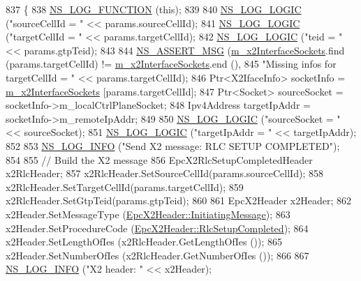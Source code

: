 \begin{DoxyCode}
837 \{
838   \hyperlink{log-macros-disabled_8h_a90b90d5bad1f39cb1b64923ea94c0761}{NS\_LOG\_FUNCTION} (\textcolor{keyword}{this});
839 
840   \hyperlink{group__logging_ga88acd260151caf2db9c0fc84997f45ce}{NS\_LOG\_LOGIC} (\textcolor{stringliteral}{"sourceCellId = "} << params.sourceCellId);
841   \hyperlink{group__logging_ga88acd260151caf2db9c0fc84997f45ce}{NS\_LOG\_LOGIC} (\textcolor{stringliteral}{"targetCellId = "} << params.targetCellId);
842   \hyperlink{group__logging_ga88acd260151caf2db9c0fc84997f45ce}{NS\_LOG\_LOGIC} (\textcolor{stringliteral}{"teid  = "} << params.gtpTeid);
843 
844   \hyperlink{assert_8h_aff5ece9066c74e681e74999856f08539}{NS\_ASSERT\_MSG} (\hyperlink{classns3_1_1EpcX2_a0665276228b9b99a52ef6d5e9bdb306d}{m\_x2InterfaceSockets}.find (params.targetCellId) != 
      \hyperlink{classns3_1_1EpcX2_a0665276228b9b99a52ef6d5e9bdb306d}{m\_x2InterfaceSockets}.end (),
845                  \textcolor{stringliteral}{"Missing infos for targetCellId = "} << params.targetCellId);
846   Ptr<X2IfaceInfo> socketInfo = \hyperlink{classns3_1_1EpcX2_a0665276228b9b99a52ef6d5e9bdb306d}{m\_x2InterfaceSockets} [params.targetCellId];
847   Ptr<Socket> sourceSocket = socketInfo->m\_localCtrlPlaneSocket;
848   Ipv4Address targetIpAddr = socketInfo->m\_remoteIpAddr;
849 
850   \hyperlink{group__logging_ga88acd260151caf2db9c0fc84997f45ce}{NS\_LOG\_LOGIC} (\textcolor{stringliteral}{"sourceSocket = "} << sourceSocket);
851   \hyperlink{group__logging_ga88acd260151caf2db9c0fc84997f45ce}{NS\_LOG\_LOGIC} (\textcolor{stringliteral}{"targetIpAddr = "} << targetIpAddr);
852 
853   \hyperlink{group__logging_gafbd73ee2cf9f26b319f49086d8e860fb}{NS\_LOG\_INFO} (\textcolor{stringliteral}{"Send X2 message: RLC SETUP COMPLETED"});
854 
855   \textcolor{comment}{// Build the X2 message}
856   EpcX2RlcSetupCompletedHeader x2RlcHeader;
857   x2RlcHeader.SetSourceCellId(params.sourceCellId);
858   x2RlcHeader.SetTargetCellId(params.targetCellId);
859   x2RlcHeader.SetGtpTeid(params.gtpTeid);
860 
861   EpcX2Header x2Header;
862   x2Header.SetMessageType (\hyperlink{classns3_1_1EpcX2Header_a0e69b043a20eaee4c570f223f4eca715a5761e50c3c1918a44e3a5ebc86f17435}{EpcX2Header::InitiatingMessage});
863   x2Header.SetProcedureCode (\hyperlink{classns3_1_1EpcX2Header_afd178c1ed3c47948c587955698a15b0da8a3e97ca98e6cf28f14010bb1e9306cb}{EpcX2Header::RlcSetupCompleted});
864   x2Header.SetLengthOfIes (x2RlcHeader.GetLengthOfIes ());
865   x2Header.SetNumberOfIes (x2RlcHeader.GetNumberOfIes ());
866 
867   \hyperlink{group__logging_gafbd73ee2cf9f26b319f49086d8e860fb}{NS\_LOG\_INFO} (\textcolor{stringliteral}{"X2 header: "} << x2Header);

\end{DoxyCode}
